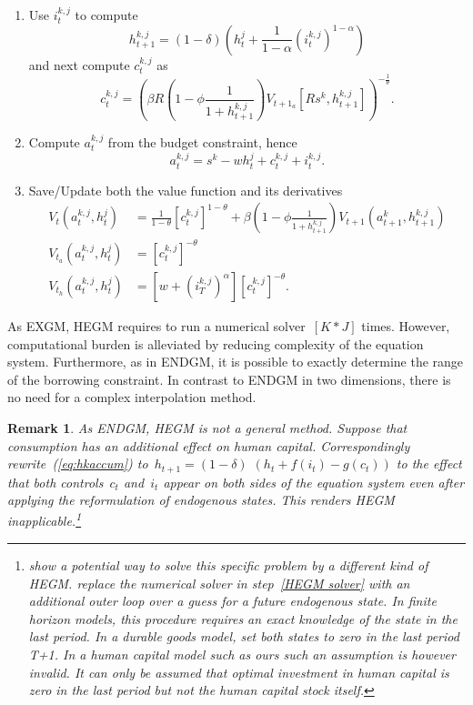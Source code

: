 \documentclass[a4paper,12pt]{article}%
\newtheorem{remark}[theorem]{Remark}
\begin{document}
\begin{enumerate}
\begin{enumerate}
\item Use $i_{t}^{k,j}$ to compute
\[
h_{t+1}^{k,j}=\left(  1-\delta\right)  \left(  h_{t}^{j}+\frac{1}{1-\alpha}\left(  i_{t}^{k,j}\right)  ^{1-\alpha}\right)
\]
and next compute $c_{t}^{k,j}$ as
\[
c_{t}^{k,j}=\left(  \beta R\left(  1-\phi\frac{1}{1+h_{t+1}^{k,j}}\right)\text{$V_{t+1_{a}}$}\left[  Rs^{k},h_{t+1}^{k,j}\right]  \right)  ^{-\frac{1}{\theta}}.
\]

\item Compute $a_{t}^{k,j}$ from the budget constraint, hence
\[
a_{t}^{k,j}=s^{k}-wh_{t}^{j}+c_{t}^{k,j}+i_{t}^{k,j}.
\]


\item Save/Update both the value function and its derivatives
\begin{align*}
V_{t}\left(  a_{t}^{k,j},h_{t}^{j}\right) &  =\frac{1}{1-\theta}\left[c_{t}^{k,j}\right]  ^{1-\theta}+\beta\left(  1-\phi\frac{1}{1+h_{t+1}^{k,j}}\right)  V_{t+1}(a_{t+1}^{k},h_{t+1}^{k,j})\\
\text{$V_{t_{a}}$}\left(  a_{t}^{k,j},h_{t}^{j}\right)   &  =\left[c_{t}^{k,j}\right]  ^{-\theta}\\
\text{$V_{t_{h}}$}\left(  a_{t}^{k,j},h_{t}^{j}\right)   &  =\left[  w+\left(i_{T}^{k,j}\right)  ^{\alpha}\right]  \left[  c_{t}^{k,j}\right]  ^{-\theta}.
\end{align*}

\end{enumerate}
\end{enumerate}

As EXGM, HEGM requires to run a numerical solver~$\left[  K\ast J\right]$ times. However, computational burden is alleviated by reducing complexity of the equation system. Furthermore, as in ENDGM, it is possible to exactly determine the range of the borrowing constraint. In contrast to ENDGM in two dimensions, there is no need for a complex interpolation method.

\begin{remark}
\label{rem:failurehegm} As ENDGM, HEGM is not a general method. Suppose that consumption has an additional effect on human capital. Correspondingly rewrite~(\ref{eq:hkaccum}) to~$h_{t+1}=\left(  1-\delta\right)$ $\left(h_{t}+f(i_{t})-g\left( c_{t}\right) \right)$ to the effect that both controls~$c_{t}$ and~$i_{t}$ appear on both sides of the equation system even after applying the reformulation of endogenous states. This renders HEGM inapplicable.\footnote{ show a potential way to solve this specific problem by a different kind of HEGM.  replace the numerical solver in step~\ref{HEGM solver} with an additional outer loop over a guess for a future endogenous state. In finite horizon models, this procedure requires an exact knowledge of the state in the last period. In a durable goods model,  set both states to zero in the last period T+1. In a human capital model such as ours such an assumption is however invalid. It can only be assumed that optimal investment in human capital is zero in the last period but not the human capital stock itself.}
\end{remark}
\end{document}
